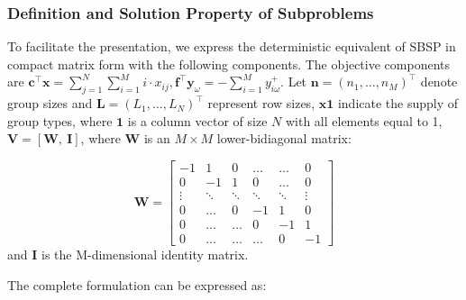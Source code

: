 \subsubsection{Definition and Solution Property of Subproblems}
To facilitate the presentation, we express the deterministic equivalent of SBSP in compact matrix form with the following components. The objective components are $\mathbf{c}^{\intercal}\mathbf{x} = \sum_{j =1}^{N} \sum_{i=1}^M i \cdot x_{ij}, \mathbf{f}^{\intercal}\mathbf{y}_{\omega} = -\sum_{i=1}^{M} y_{i \omega}^{+}$. Let $\mathbf{n} = (n_1, \ldots, n_M)^{\intercal}$ denote group sizes and $\mathbf{L} = (L_1, \ldots, L_N)^{\intercal}$ represent row sizes, $\mathbf{x} \mathbf{1}$ indicate the supply of group types, where $\mathbf{1}$ is a column vector of size $N$ with all elements equal to 1, $\mathbf{V} = [\mathbf{W}, ~\mathbf{I}]$, where $\mathbf{W}$ is an $M \times M$ lower-bidiagonal matrix:

$$
\mathbf{W}=\left[\begin{array}{cccccc}
-1 & 1 & 0 & \ldots & \ldots & 0 \\
0 & -1 & 1 &    0   & \ldots & 0 \\
\vdots & \ddots & \ddots & \ddots & \ddots & \vdots \\
0  & \ldots   &  0  & -1 & 1 & 0 \\
0  & \ldots   &  \ldots  &  0 &  -1 & 1 \\
0 & \ldots & \ldots & \ldots & 0 & -1
\end{array}\right]
$$
and $\mathbf{I}$ is the M-dimensional identity matrix.

The complete formulation can be expressed as:


